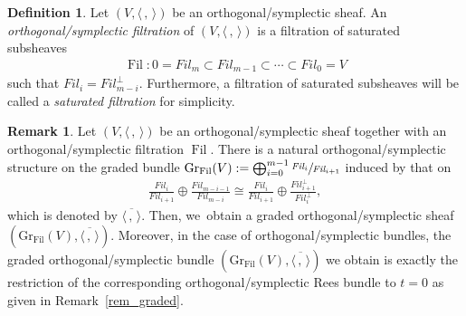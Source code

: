\documentclass[JEP,XML,SOM,Unicode,published]{cedram}
\newcommand{\Fil}{\textit{Fil}}
\DeclareMathOperator{\Filt}{Fil}
\newcommand{\Gr}{\mathrm{Gr}}
\theoremstyle{plain}
\theoremstyle{definition}
\newtheorem{defn}[thm]{Definition}
\newtheorem{rem}[thm]{Remark}
\begin{document}
\begin{defn}
Let $(V,\langle \,, \, \rangle)$ be an orthogonal/symplectic sheaf. An \emph{orthogonal/symplectic filtration} of $(V,\langle \,, \, \rangle)$ is a filtration of saturated subsheaves
\begin{align*}
\Filt: 0=\Fil_m \subset \Fil_{m-1} \subset \cdots \subset \Fil_0=V
\end{align*}
such that $\Fil_{i}= \Fil_{m-i}^\perp$. Furthermore, a filtration of saturated subsheaves will be called a \emph{saturated filtration} for simplicity.
\end{defn}

\begin{rem}
Let $(V, \langle \,, \, \rangle)$ be an orthogonal/symplectic sheaf together with an orthogonal/symplectic filtration $\Filt$. There is a natural orthogonal/symplectic structure on the graded bundle
$\Gr_{\Filt}(V):=\mathop{\bigoplus}_{i=0}^{m-1}\sfrac{\Fil_i} {\Fil_{i+1}}$ induced by that on
\begin{align*}
\frac{\Fil_i}{\Fil_{i+1}} \oplus \frac{\Fil_{m-i-1}}{\Fil_{m-i}} \cong \frac{\Fil_{i}}{\Fil_{i+1}} \oplus \frac{\Fil^\perp_{i+1}}{\Fil^\perp_{i}},
\end{align*}
which is denoted by $\overline{\langle \,, \, \rangle}$. Then, we~obtain a graded orthogonal/symplectic sheaf $(\Gr_{\Filt}(V), \overline{\langle \,, \, \rangle})$. Moreover, in the case of orthogonal/symplectic bundles, the graded orthogonal/symplectic bundle $(\Gr_{\Filt}(V), \overline{\langle \,, \, \rangle})$ we obtain is exactly the restriction of the corresponding orthogonal/symplectic Rees bundle to $t=0$ as given in Remark~\ref{rem_graded}.
\end{rem}

\label{subsect_log_lambda_conn}
\end{document}

